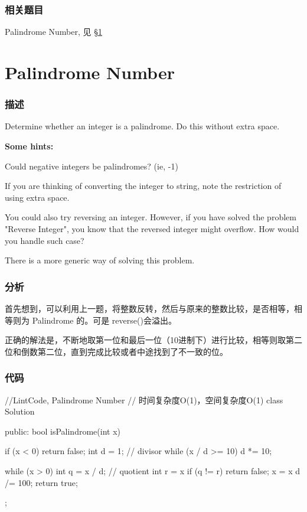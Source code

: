 \subsubsection{相关题目}
\begindot
\item Palindrome Number, 见 \S \ref{sec:palindrome-number}
\myenddot


\section{Palindrome Number} %
\label{sec:palindrome-number}


\subsubsection{描述}
Determine whether an integer is a palindrome. Do this without extra space.

\textbf{Some hints:}

Could negative integers be palindromes? (ie, -1)

If you are thinking of converting the integer to string, note the restriction of using extra space.

You could also try reversing an integer. However, if you have solved the problem "Reverse Integer", you know that the reversed integer might overflow. How would you handle such case?

There is a more generic way of solving this problem.


\subsubsection{分析}
首先想到，可以利用上一题，将整数反转，然后与原来的整数比较，是否相等，相等则为 Palindrome 的。可是 reverse()会溢出。

正确的解法是，不断地取第一位和最后一位（10进制下）进行比较，相等则取第二位和倒数第二位，直到完成比较或者中途找到了不一致的位。


\subsubsection{代码}
\begin{Code}
//LintCode, Palindrome Number
// 时间复杂度O(1)，空间复杂度O(1)
class Solution {
public:
    bool isPalindrome(int x) {
        if (x < 0) return false;
        int d = 1; // divisor
        while (x / d >= 10) d *= 10;

        while (x > 0) {
            int q = x / d;  // quotient
            int r = x %
            if (q != r) return false;
            x = x %
            d /= 100;
        }
        return true;
    }
};
\end{Code}


